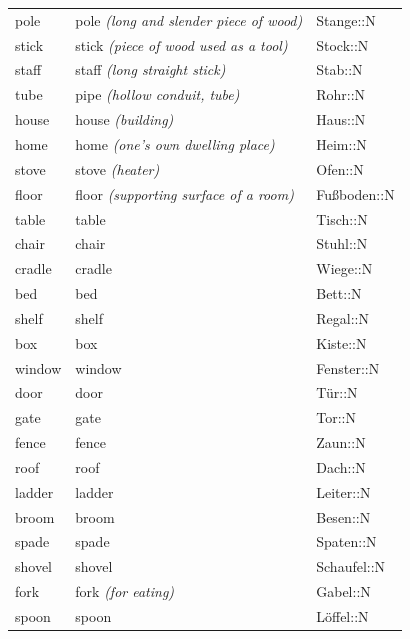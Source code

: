 \begin{center}
\begin{longtable}{lll}
{\sc \lowercase{	POLE	}}	&	pole	\textit{\footnotesize (long and slender piece of wood)}	&	Stange::N	\\
{\sc \lowercase{	STICK	}}	&	stick	\textit{\footnotesize (piece of wood used as a tool)}	&	Stock::N	\\
{\sc \lowercase{	STAFF	}}	&	staff	\textit{\footnotesize (long straight stick)}	&	Stab::N	\\
{\sc \lowercase{	TUBE	}}	&	pipe	\textit{\footnotesize (hollow conduit, tube)}	&	Rohr::N	\\
{\sc \lowercase{	HOUSE	}}	&	house	\textit{\footnotesize (building)}	&	Haus::N	\\
{\sc \lowercase{	HOME	}}	&	home	\textit{\footnotesize (one’s own dwelling place)}	&	Heim::N	\\
{\sc \lowercase{	STOVE	}}	&	stove	\textit{\footnotesize (heater)}	&	Ofen::N	\\
{\sc \lowercase{	FLOOR	}}	&	floor	\textit{\footnotesize (supporting surface of a room)}	&	Fußboden::N	\\
{\sc \lowercase{	TABLE	}}	&	table		&	Tisch::N	\\
{\sc \lowercase{	CHAIR	}}	&	chair		&	Stuhl::N	\\
{\sc \lowercase{	CRADLE	}}	&	cradle		&	Wiege::N	\\
{\sc \lowercase{	BED	}}	&	bed		&	Bett::N	\\
{\sc \lowercase{	SHELF	}}	&	shelf		&	Regal::N	\\
{\sc \lowercase{	BOX	}}	&	box		&	Kiste::N	\\
{\sc \lowercase{	WINDOW	}}	&	window		&	Fenster::N	\\
{\sc \lowercase{	DOOR	}}	&	door		&	Tür::N	\\
{\sc \lowercase{	GATE	}}	&	gate		&	Tor::N	\\
{\sc \lowercase{	FENCE	}}	&	fence		&	Zaun::N	\\
{\sc \lowercase{	ROOF	}}	&	roof		&	Dach::N	\\
{\sc \lowercase{	LADDER	}}	&	ladder		&	Leiter::N	\\
{\sc \lowercase{	BROOM	}}	&	broom		&	Besen::N	\\
{\sc \lowercase{	SPADE	}}	&	spade		&	Spaten::N	\\
{\sc \lowercase{	SHOVEL	}}	&	shovel		&	Schaufel::N	\\
{\sc \lowercase{	FORK	}}	&	fork	\textit{\footnotesize (for eating)}	&	Gabel::N	\\
{\sc \lowercase{	SPOON	}}	&	spoon		&	Löffel::N	\\

\end{longtable}
\end{center}

